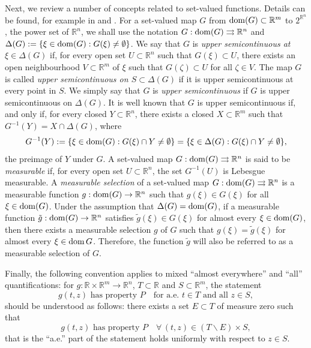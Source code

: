 \documentclass[a4paper,11pt]{article}
\newcommand{\R}{\mathbb R}
\numberwithin{equation}{section}
\numberwithin{figure}{section}
\numberwithin{table}{section}
\begin{document}
Next, we review a number of concepts related to set-valued functions. Details can be found, for example in \cite{af09,d92} and \cite[Chapter 2]{v00}. For a set-valued map $G$ from ${\rm dom}(G)\subset\R^m$ to $2^{\R^n}$, the power set of $\R^n$, we shall use the notation $G:{\rm dom}(G)\rightrightarrows\R^n$ and $\Delta(G):=\{\xi\in{\rm dom}(G):G(\xi)\not=\emptyset\}$. We say that $G$ is {\it upper semicontinuous at} $\xi\in\Delta(G)$ if, for every open set $U\subset\R^n$ such that $G(\xi)\subset U$, there exists an open neighbourhood $V\subset\R^m$ of $\xi$ such that $G(\zeta)\subset U$ for all $\zeta\in V$. The map $G$ is called {\it upper semicontinuous on $S\subset\Delta(G)$} if it is upper semicontinuous at every point in $S$. We simply say that $G$ is {\it upper semicontinuous} if $G$ is upper semicontinuous on $\Delta(G)$. It is well known
that $G$ is upper semicontinuous if, and only if, for every closed $Y\subset\R^n$, there exists
a closed $X\subset\R^m$ such that $G^{-1}(Y)=X\cap\Delta(G)$, where
\[
G^{-1}(Y):=\{\xi\in{\rm dom}(G): G(\xi)\cap Y\not=\emptyset\}=\{\xi\in\Delta(G): G(\xi)\cap Y\not=\emptyset\},
\]
the preimage of $Y$ under $G$. A set-valued map $G:{\rm dom}(G)\rightrightarrows\R^n$ is said to be {\it measurable} if, for every open set $U\subset\R^n$, the set $G^{-1}(U)$ is Lebesgue measurable. A {\it measurable selection} of a set-valued map $G:{\rm dom}(G)\rightrightarrows\R^n$ is a measurable function $g:{\rm dom}(G)\to\R^n$ such that $g(\xi)\in G(\xi)$ for all $\xi\in{\rm dom}(G)$. Under the assumption that $\Delta(G)={\rm dom}(G)$, if a measurable function $\tilde g:{\rm dom}(G)\to\R^n$ satisfies $\tilde g(\xi)\in G(\xi)$ for almost every $\xi\in{\rm dom}(G)$, then there exists a measurable selection $g$ of $G$ such that $g(\xi)=\tilde g(\xi)$ for almost every $\xi\in{\rm dom}\,G$. Therefore, the function $\tilde g$ will also be referred to as a measurable selection of $G$.

Finally, the following convention applies to mixed ``almost everywhere'' and ``all'' quantifications: for $g:\R\times\R^m\to\R^n$, $T\subset\R$ and $S\subset\R^m$, the statement
\[
\mbox{$g(t,z)$ has property $P$}\quad\mbox{for a.e. $t\in T$ and all $z\in S$},
\]
should be understood as follows: there exists a set $E\subset T$ of measure zero such that
\[
\mbox{$g(t,z)$ has property $P$}\quad\forall\,(t,z)\in(T\backslash E)\times S,
\]
that is the ``a.e.'' part of the statement holds uniformly with respect to $z\in S$.
%
%
\end{document}
